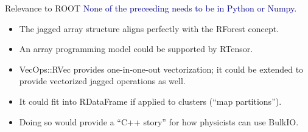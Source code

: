 \documentclass[aspectratio=169]{beamer}
\begin{document}
\begin{frame}{Relevance to ROOT}
\large
\vspace{0.5 cm}
\textcolor{darkblue}{\Large None of the preceeding needs to be in Python or Numpy.}

\vspace{0.5 cm}

\vspace{0.5 cm}
\begin{itemize}
\item<3-> The jagged array structure aligns perfectly with the RForest concept.
\item<4-> An array programming model could be supported by RTensor.
\item<5-> VecOps::RVec provides one-in-one-out vectorization; it could be extended to provide vectorized jagged operations as well.
\item<6-> It could fit into RDataFrame if applied to clusters (``map partitions'').
\item<7-> Doing so would provide a ``C++ story'' for how physicists can use BulkIO.
\end{itemize}
\end{frame}
\end{document}
